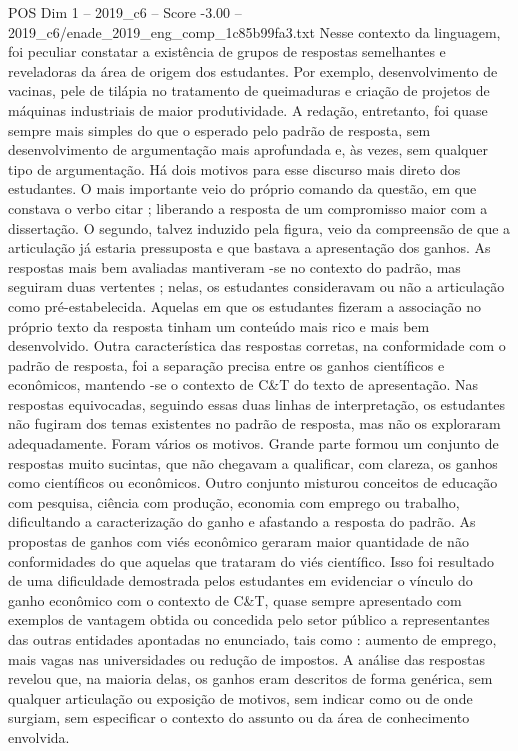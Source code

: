 \begin{textsample}{POS Dim 1 – 2019\_c6 – Score -3.00 – 2019\_c6/enade\_2019\_eng\_comp\_1c85b99fa3.txt}
Nesse contexto da linguagem, foi peculiar constatar a existência de grupos de respostas semelhantes e reveladoras da área de origem dos estudantes.
Por exemplo, desenvolvimento de vacinas, pele de tilápia no tratamento de queimaduras e criação de projetos de máquinas industriais de maior produtividade.
A redação, entretanto, foi quase sempre mais simples do que o esperado pelo padrão de resposta, sem desenvolvimento de argumentação mais aprofundada e, às vezes, sem qualquer tipo de argumentação.
Há dois motivos para esse discurso mais direto dos estudantes.
O mais importante veio do próprio comando da questão, em que constava o verbo citar ; liberando a resposta de um compromisso maior com a dissertação.
O segundo, talvez induzido pela figura, veio da compreensão de que a articulação já estaria pressuposta e que bastava a apresentação dos ganhos.
As respostas mais bem avaliadas mantiveram -se no contexto do padrão, mas seguiram duas vertentes ; nelas, os estudantes consideravam ou não a articulação como pré-estabelecida.
Aquelas em que os estudantes fizeram a associação no próprio texto da resposta tinham um conteúdo mais rico e mais bem desenvolvido.
Outra característica das respostas corretas, na conformidade com o padrão de resposta, foi a separação precisa entre os ganhos científicos e econômicos, mantendo -se o contexto de C\&T do texto de apresentação.
Nas respostas equivocadas, seguindo essas duas linhas de interpretação, os estudantes não fugiram dos temas existentes no padrão de resposta, mas não os exploraram adequadamente.
Foram vários os motivos.
Grande parte formou um conjunto de respostas muito sucintas, que não chegavam a qualificar, com clareza, os ganhos como científicos ou econômicos.
Outro conjunto misturou conceitos de educação com pesquisa, ciência com produção, economia com emprego ou trabalho, dificultando a caracterização do ganho e afastando a resposta do padrão.
As propostas de ganhos com viés econômico geraram maior quantidade de não conformidades do que aquelas que trataram do viés científico.
Isso foi resultado de uma dificuldade demostrada pelos estudantes em evidenciar o vínculo do ganho econômico com o contexto de C\&T, quase sempre apresentado com exemplos de vantagem obtida ou concedida pelo setor público a representantes das outras entidades apontadas no enunciado, tais como : aumento de emprego, mais vagas nas universidades ou redução de impostos.
A análise das respostas revelou que, na maioria delas, os ganhos eram descritos de forma genérica, sem qualquer articulação ou exposição de motivos, sem indicar como ou de onde surgiam, sem especificar o contexto do assunto ou da área de conhecimento envolvida.

\end{textsample}
